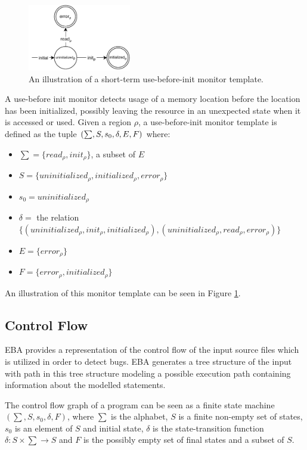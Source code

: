 \begin{figure}[H]
    \centering
    \includegraphics[width=0.4\textwidth]{algorithm/figures/use-before}
    \caption{An illustration of a short-term use-before-init monitor template.}
    \label{use-before-automata}
\end{figure}

A use-before init monitor detects usage of a memory location before the location has been initialized, possibly leaving the resource in an unexpected state when it is accessed or used. Given a region $\rho$, a use-before-init monitor template is defined as the tuple $(\sum, S, s_0, \delta, E, \\F)$ where: 

\begin{itemize}
    \item $\sum = \{read_\rho, init_\rho\}$, a subset of $E$
    \item $S = \{ uninitialized_\rho, initialized_\rho, error_\rho \}$
    \item $s_0 = uninitialized_\rho$ 
    \item $\delta =$ the relation $\{(uninitialized_\rho, init_\rho, initialized_\rho), (uninitialized_\rho, read_\rho, error_\rho)\}$ 
    \item $E = \{ error_\rho \}$  
    \item $F = \{ error_\rho, initialized_\rho \}$
\end{itemize}

An illustration of this monitor template can be seen in Figure \ref{use-before-automata}. 

\subsection{Control Flow}

EBA provides a representation of the control flow of the input source files which is utilized in order to detect bugs. EBA generates a tree structure of the input with path in this tree structure modeling a possible execution path containing information about the modelled statements. 

\newpar The control flow graph of a program can be seen as a finite state machine $(\sum, S, s_0, \delta, F)$, where $\sum$ is the alphabet, $S$ is a finite non-empty set of states, $s_0$ is an element of $S$ and initial state, $\delta$ is the state-transition function $\delta: S \times \sum \rightarrow S$ and $F$ is the possibly empty set of final states and a subset of $S$. 

